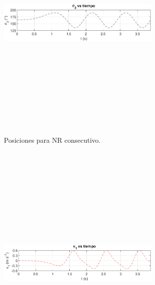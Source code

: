 \documentclass[12pt]{article}
\begin{document}
\begin{multicols}{2}
\begin{figure} [H]
    \end{figure}
        \vspace{-20pt}
        \begin{figure} [H]
        \centerline{\includegraphics[width=8cm, height=12cm,keepaspectratio]{NR Consecutivo/theta3.png}}
        \caption{Posiciones para NR consecutivo.}
        \label{}
    \end{figure}
\begin{figure} [H]
        \centerline{\includegraphics[width=8cm, height=12cm,keepaspectratio]{NR Consecutivo/v1.png}}

\end{figure}
\end{multicols}
\end{document}
